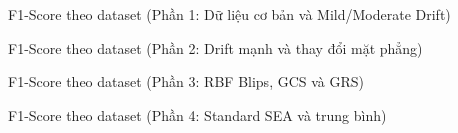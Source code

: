 \begin{table}[H]
	\centering
	\caption{F1-Score theo dataset (Phần 1: Dữ liệu cơ bản và Mild/Moderate Drift)}
	\label{tab:f1_by_dataset_part1}
	
\end{table}

\begin{table}[H]
	\centering
	\caption{F1-Score theo dataset (Phần 2: Drift mạnh và thay đổi mặt phẳng)}
	\label{tab:f1_by_dataset_part2}
	
\end{table}

\begin{table}[H]
	\centering
	\caption{F1-Score theo dataset (Phần 3: RBF Blips, GCS và GRS)}
	\label{tab:f1_by_dataset_part3}
	
\end{table}

\begin{table}[H]
	\centering
	\caption{F1-Score theo dataset (Phần 4: Standard SEA và trung bình)}
	\label{tab:f1_by_dataset_part4}
	
\end{table}

